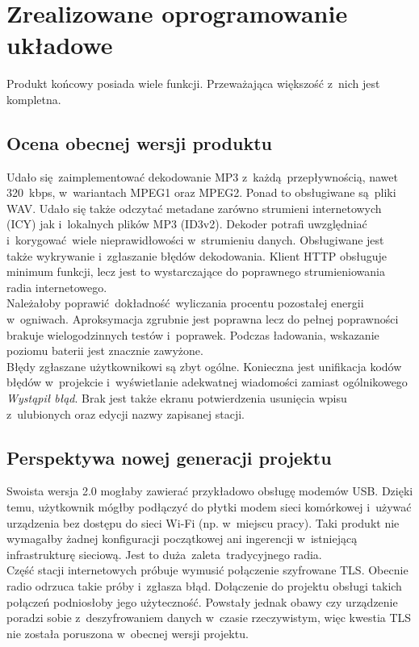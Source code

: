 \documentclass[polish]{aghengthesis}
\begin{document}
	\section{Zrealizowane oprogramowanie układowe}
		Produkt końcowy posiada wiele funkcji. Przeważająca większość z~nich jest kompletna.
		
		\subsection{Ocena obecnej wersji produktu}
			Udało się zaimplementować dekodowanie MP3 z~każdą przepływnością, nawet 320~kbps, w~wariantach MPEG1 oraz MPEG2. Ponad to obsługiwane są pliki WAV. Udało się także odczytać metadane zarówno strumieni internetowych (ICY) jak i~lokalnych plików MP3 (ID3v2). Dekoder potrafi uwzględniać i~korygować wiele nieprawidłowości w~strumieniu danych. Obsługiwane jest także wykrywanie i~zgłaszanie błędów dekodowania. Klient HTTP obsługuje minimum funkcji, lecz jest to wystarczające do poprawnego strumieniowania radia internetowego.
			$ $\\
			
			Należałoby poprawić dokładność wyliczania procentu pozostałej energii w~ogniwach. Aproksymacja zgrubnie jest poprawna lecz do pełnej poprawności brakuje wielogodzinnych testów i~poprawek. Podczas ładowania, wskazanie poziomu baterii jest znacznie zawyżone.
			$ $\\
			
			Błędy zgłaszane użytkownikowi są zbyt ogólne. Konieczna jest unifikacja kodów błędów w~projekcie i~wyświetlanie adekwatnej wiadomości zamiast ogólnikowego \textit{Wystąpił błąd}. Brak jest także ekranu potwierdzenia usunięcia wpisu z~ulubionych oraz edycji nazwy zapisanej stacji.
		
		\subsection{Perspektywa nowej generacji projektu}
			Swoista wersja 2.0 mogłaby zawierać przykładowo obsługę modemów USB. Dzięki temu, użytkownik mógłby podłączyć do płytki modem sieci komórkowej i~używać urządzenia bez dostępu do sieci Wi-Fi (np. w~miejscu pracy). Taki produkt nie wymagałby żadnej konfiguracji początkowej ani ingerencji w~istniejącą infrastrukturę sieciową. Jest to duża zaleta tradycyjnego radia.
			$ $\\
			
			Część stacji internetowych próbuje wymusić połączenie szyfrowane TLS. Obecnie radio odrzuca takie próby i~zgłasza błąd. Dołączenie do projektu obsługi takich połączeń podniosłoby jego użyteczność. Powstały jednak obawy czy urządzenie poradzi sobie z~deszyfrowaniem danych w~czasie rzeczywistym, więc kwestia TLS nie została poruszona w~obecnej wersji projektu.
			$ $\\
			
\end{document}
